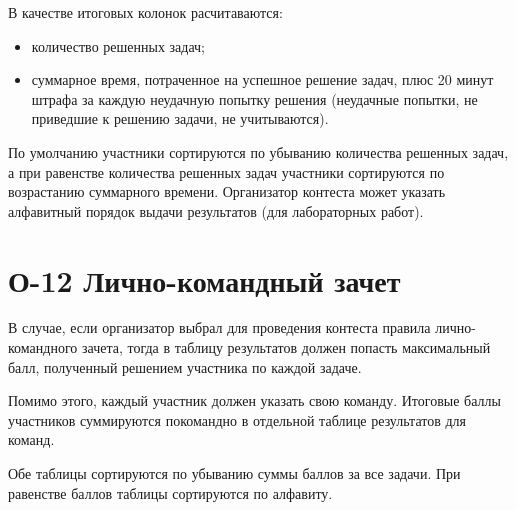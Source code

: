\documentclass{book}
\newcommand{\newcard}[1]{\newpage \section*{#1}}
\begin{document}
	В качестве итоговых колонок расчитаваются:
	\begin{itemize}
		\item количество решенных задач;
		\item суммарное время, потраченное на успешное решение задач, плюс 20 минут штрафа за каждую неудачную попытку решения (неудачные попытки, не приведшие к решению задачи, не учитываются).
	\end{itemize} 
	
	По умолчанию участники сортируются по убыванию количества решенных задач, а при равенстве количества решенных задач участники сортируются по возрастанию суммарного времени. Организатор контеста может указать алфавитный порядок выдачи результатов (для лабораторных работ).


\newcard{О-12 Лично-командный зачет}
	В случае, если организатор выбрал для проведения контеста правила лично-командного зачета, тогда в таблицу результатов должен попасть максимальный балл, полученный решением участника по каждой задаче.

	Помимо этого, каждый участник должен указать свою команду. Итоговые баллы участников суммируются покомандно в отдельной таблице результатов для команд.

	Обе таблицы сортируются по убыванию суммы баллов за все задачи. При равенстве баллов таблицы сортируются по алфавиту.
	
\end{document}
